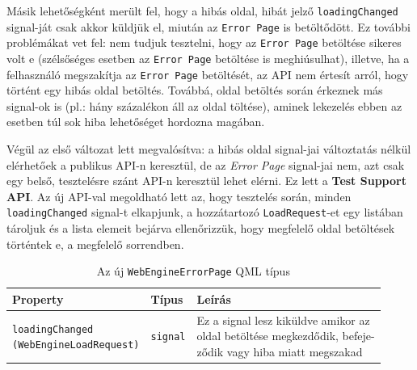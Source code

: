 \documentclass[12pt]{report}
\begin{document}
Másik lehetőségként merült fel, hogy a hibás oldal, hibát jelző \texttt{loadingChanged}
signal-ját csak akkor küldjük el, miután az \texttt{Error Page} is betöltődött. Ez további
problémákat vet fel: nem tudjuk tesztelni, hogy az \texttt{Error Page} betöltése sikeres
volt e (szélsőséges esetben az \texttt{Error Page} betöltése is meghiúsulhat),
illetve, ha a felhasználó megszakítja az \texttt{Error Page} betöltését, az API nem értesít
arról, hogy történt egy hibás oldal betöltés. Továbbá, oldal betöltés során érkeznek más
signal-ok is (pl.: hány százalékon áll az oldal töltése), aminek lekezelés ebben az esetben
túl sok hiba lehetőséget hordozna magában.

Végül az első változat lett megvalósítva: a hibás oldal signal-jai változtatás nélkül
elérhetőek a publikus API-n keresztül, de az \textit{Error Page} signal-jai nem, azt csak
egy belső, tesztelésre szánt API-n keresztül lehet elérni. Ez lett a
\textbf{Test Support API}. Az új API-val megoldható lett az, hogy tesztelés során, minden
\texttt{loadingChanged} signal-t elkapjunk, a hozzátartozó \texttt{LoadRequest}-et egy
listában tároljuk és a lista elemeit bejárva ellenőrizzük, hogy megfelelő oldal betöltések
történtek e, a megfelelő sorrendben.

\begin{table}[h!]
    \centering
    \begin{tabular}{ | l | l | p{185pt} | }
        \hline
        \textbf{Property} & \textbf{Típus} & \textbf{Leírás} \\ \hline

        \makecell[l]{\texttt{loadingChanged} \\ \texttt{(WebEngineLoadRequest)}} &
        \texttt{signal} &
        \makecell[l]{
        Ez a signal lesz kiküldve amikor az \\
        oldal betöltése megkezdődik, befeje-\\
        ződik vagy hiba miatt megszakad}
        \\ \hline
    \end{tabular}
    \caption{
        \label{tab:test-support-webengine-errorpage}
        Az új \texttt{WebEngineErrorPage} QML típus
    }
\end{table}
\end{document}
